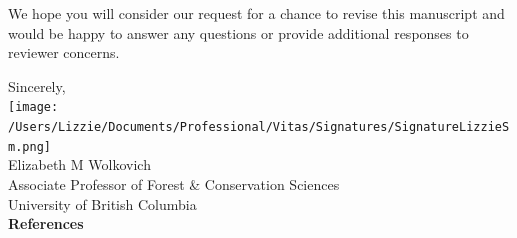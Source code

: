 \documentclass[11pt]{article}
\begin{document}
We hope you will consider our request for a chance to revise this manuscript and would be happy to answer any questions or provide additional responses to reviewer concerns. 

Sincerely,\\

\texttt{[image: /Users/Lizzie/Documents/Professional/Vitas/Signatures/SignatureLizzieSm.png]} \\

Elizabeth M Wolkovich\\
Associate Professor of Forest \& Conservation Sciences\\ 
University of British Columbia\\

\newpage
{\bf References}
\vspace{-8ex}

\end{document}
